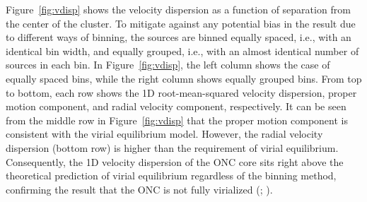 \documentclass[12pt]{ucsddissertation}
\begin{document}
\begin{CJK*}{UTF8}{gbsn}
Figure~\ref{fig:vdisp} shows the velocity dispersion as a function of separation from the center of the cluster. To mitigate against any potential bias in the result due to different ways of binning, the sources are binned equally spaced, i.e., with an identical bin width, and equally grouped, i.e., with an almost identical number of sources in each bin. In Figure~\ref{fig:vdisp}, the left column shows the case of equally spaced bins, while the right column shows equally grouped bins. From top to bottom, each row shows the 1D root-mean-squared velocity dispersion, proper motion component, and radial velocity component, respectively. It can be seen from the middle row in Figure~\ref{fig:vdisp} that the proper motion component is consistent with the virial equilibrium model. However, the radial velocity dispersion (bottom row) is higher than the requirement of virial equilibrium. Consequently, the 1D velocity dispersion of the ONC core sits right above the theoretical prediction of virial equilibrium regardless of the binning method, confirming the result that the ONC is not fully virialized (\citealt{DaRio-2014}; ).


\end{CJK*}
\end{document}
